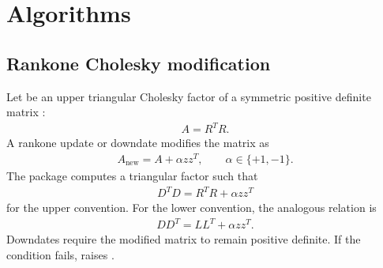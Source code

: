 \documentclass[a4paper,11pt,english]{sphinxmanual}
\begin{document}
\chapter{Algorithms}
\label{\detokenize{algorithms:algorithms}}\label{\detokenize{algorithms::doc}}

\section{Rank\sphinxhyphen{}one Cholesky modification}
\label{\detokenize{algorithms:rank-one-cholesky-modification}}
\sphinxAtStartPar
Let  be an upper triangular Cholesky factor of a symmetric positive
definite matrix :
\begin{equation*}
\begin{split}A = R^T R.\end{split}
\end{equation*}
\sphinxAtStartPar
A rank\sphinxhyphen{}one update or downdate modifies the matrix as
\begin{equation*}
\begin{split}A_{\mathrm{new}} = A + \alpha z z^T,
\qquad \alpha \in \{+1, -1\}.\end{split}
\end{equation*}
\sphinxAtStartPar
The package computes a triangular factor  such that
\begin{equation*}
\begin{split}D^T D = R^T R + \alpha z z^T\end{split}
\end{equation*}
\sphinxAtStartPar
for the upper convention.  For the lower convention, the analogous relation is
\begin{equation*}
\begin{split}D D^T = L L^T + \alpha z z^T.\end{split}
\end{equation*}
\sphinxAtStartPar
Downdates require the modified matrix to remain positive definite.  If the
condition fails,  raises .
\end{document}

